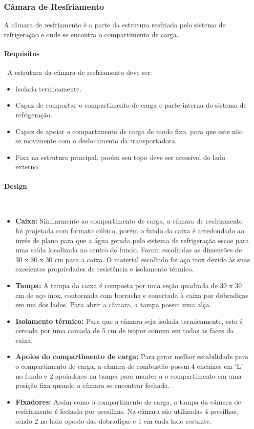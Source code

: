 \subsubsection{Câmara de Resfriamento}

A câmara de resfriamento é a parte da estrutura resfriada pelo sistema de refrigeração e onde se encontra o compartimento de carga.

\paragraph*{Requisitos}\
A estrutura da câmara de resfriamento deve ser:

\begin{itemize}
\item Isolada termicamente.
\item Capaz de comportar o compartimento de carga e parte interna do sistema de refrigeração.
\item Capaz de apoiar o compartimento de carga de modo fixo, para que este não se movimente com o deslocamento da transportadora.
\item Fixa na estrutura principal, porém seu topo deve ser acessível do lado externo.
\end{itemize}

\paragraph*{Design}\
\begin{itemize}
\item \textbf{Caixa:} Similarmente ao compartimento de carga, a câmara de resfriamento foi projetada com formato cúbico, porém o fundo da caixa é arredondado ao invés de plano para que a água gerada pelo sistema de refrigeração escoe para uma saída localizada no centro do fundo. Foram escolhidas as dimensões de 30 x 30 x 30 cm para a caixa. O material escolhido foi aço inox devido às suas excelentes propriedades de resistência e isolamento térmico.
\item \textbf{Tampa:} A tampa da caixa é composta por uma seção quadrada de 30 x 30 cm de aço inox, contornada com borracha e conectada à caixa por dobradiças em um dos lados. Para abrir a câmara, a tampa possui uma alça.
\item \textbf{Isolamento térmico:} Para que a câmara seja isolada termicamente, esta é cercada por uma camada de 5 cm de isopor comum em todas as faces da caixa.
\item \textbf{Apoios do compartimento de carga:} Para gerar melhor estabilidade para o compartimento de carga, a câmara de combustão possui 4 encaixes em ‘L’ no fundo e 2 apoiadores na tampa para manter a o compartimento em uma posição fixa quando a câmara se encontrar fechada.
\item \textbf{ Fixadores:} Assim como o compartimento de carga, a tampa da câmara de resfriamento é fechada por presilhas. Na câmara são utilizadas 4 presilhas, sendo 2 no lado oposto das dobradiças e 1 em cada lado restante.
\end{itemize}


